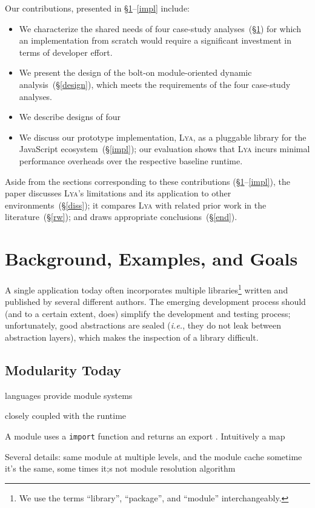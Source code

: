 \documentclass[letterpaper,twocolumn,10pt]{article}
\def\ie{{\em i.e.}, }
\newcommand{\ttt}[1]{\texttt{#1}}
\newcommand{\sx}[1]{(\S\ref{#1})}
\newcommand{\sys}{{\scshape Lya}\xspace}
\begin{document}
Our contributions, presented in \S\ref{bg}--\ref{impl} include:
\begin{itemize}
\item We characterize the shared needs of four case-study analyses~\sx{bg} for which an implementation from scratch would require a significant investment in terms of developer effort.
\item We present the design of the bolt-on module-oriented dynamic analysis~\sx{design}, which meets the requirements of the four case-study analyses.
\item We describe designs of four 
\item We discuss our prototype implementation, \sys, as a pluggable library for the JavaScript ecosystem~\sx{impl}; our evaluation shows that \sys incurs minimal performance overheads over the respective baseline runtime.
\end{itemize}

Aside from the sections corresponding to these contributions (\S\ref{bg}--\ref{impl}), the paper discusses \sys's limitations and its application to other environments~\sx{diss};
   it compares \sys with related prior work in the literature~\sx{rw}; and draws appropriate conclusions~\sx{end}.


\section{Background, Examples, and Goals}
\label{bg}

A single application today often incorporates multiple libraries\footnote{We use the terms ``library'', ``package'', and ``module'' interchangeably.} written and published by several different authors.
The emerging development process should (and to a certain extent, does) simplify the development and testing process;
  unfortunately, good abstractions are sealed (\ie they do not leak between abstraction layers), which makes the inspection of a library difficult.

\subsection{Modularity Today}

languages provide module systems

closely coupled with the runtime

A module uses a \ttt{import} function and returns an export .
Intuitively a map

Several details:
  same module at multiple levels, and the module cache
  sometime it's the same, some times it;s not
  module resolution algorithm
\end{document}
